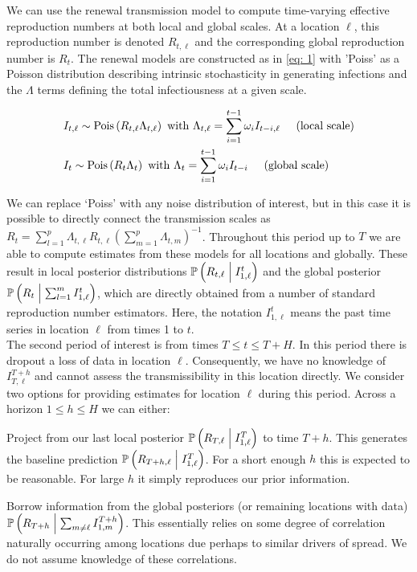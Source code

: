 \documentclass[12pt]{article}
\newcommand{\cond}{\; \m| \;}
\begin{document}
We can use the renewal transmission model to compute time-varying effective reproduction numbers at both local and global scales. At a location $\ell$, this reproduction number is denoted $R_{t, \ell}$ and the corresponding global reproduction number is $R_{t}$. The renewal models are constructed as in \eqref{eq: 1} with 'Poiss' as a Poisson distribution describing intrinsic stochasticity in generating infections and the $\Lambda$ terms defining the total infectiousness at a given scale.

\begin{equation}\label{eq: 1}
\begin{aligned}
& I_{t, \ell} \sim \text{Pois} 
\left(R_{t, \ell}\Lambda_{t, \ell}\right) \text{ with } \Lambda_{t, \ell} = \sum_{i=1}^{t-1}
\omega_{i}I_{t-i, \ell} \hspace{0.5cm}\text{(local scale)} \\
& I_t \sim \text{Pois} 
\left(R_t\Lambda_t\right) \text{ with } \Lambda_t = \sum_{i=1}^{t-1}
\omega_{i}I_{t-i} \hspace{0.5cm}\text{(global scale)}
\end{aligned}
\end{equation}

We can replace `Poiss' with any noise distribution of interest, but in this case it is possible to directly connect the transmission scales as $R_t = \sum_{l=1}^p \Lambda_{t, \ell}R_{t, \ell}\left(\sum_{m=1}^p \Lambda_{t, m}\right)^{-1}$. Throughout this period up to $T$ we are able to compute estimates from these models for all locations and globally. These result in local posterior distributions $\mathbb{P}\left(R_{t,
\ell} \cond I_{1, \ell}^{t}\right)$ and the global posterior $\mathbb{P}\left(R_{t} \cond \sum_{l=1}^m I_{1, \ell}^{t}\right)$, which are directly obtained from a number of standard reproduction number estimators. Here, the notation $I_{1, \ell}^{t}$ means the past time series in location $\ell$ from times 1 to $t$.\\

The second period of interest is from times $T \leq t \leq T+H$. In this period there is dropout \ie a loss of data in location $\ell$. Consequently, we have no knowledge of $I_{T, \ell}^{T+h}$ and cannot assess the transmissibility in this location directly. We consider two options for providing estimates for location $\ell$ during this period. Across a horizon $1 \leq h \leq H$ we can either:
\benum
\item Project from our last local posterior $\mathbb{P}\left(R_{T, \ell}  \cond I_{1, \ell}^{T}\right)$ to time $T+h$. This generates the baseline prediction $\mathbb{P}\left(R_{T+h, \ell}  \cond I_{1, \ell}^{T}\right)$. For a short enough $h$ this is expected to be reasonable. For large $h$ it simply reproduces our prior information.
\item Borrow information from the global posteriors (or remaining locations with data) $\mathbb{P}\left(R_{T+h}  \cond \sum_{m \neq \ell} I_{1, m}^{T+h}\right)$. This essentially relies on some degree of correlation naturally occurring among locations due perhaps to similar drivers of spread. We do not assume knowledge of these correlations.
\eenum
\end{document}
